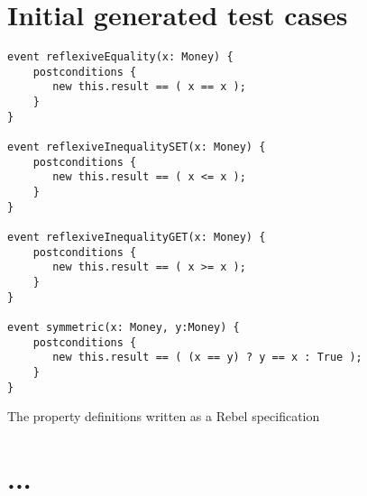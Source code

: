 %



\appendix
\chapter{Initial generated test cases}
\label{app:a_event_definitions}
\begin{sourcecode}[h!]
\begin{lstlisting}[language=Rebel]
event reflexiveEquality(x: Money) {
    postconditions {
       new this.result == ( x == x );
    }
}

event reflexiveInequalitySET(x: Money) {
    postconditions {
       new this.result == ( x <= x );
    }
}

event reflexiveInequalityGET(x: Money) {
    postconditions {
       new this.result == ( x >= x );
    }
}

event symmetric(x: Money, y:Money) {
    postconditions {
       new this.result == ( (x == y) ? y == x : True );
    }
}
\end{lstlisting}
\caption{The property definitions written as a Rebel specification}
\end{sourcecode}

\chapter{...}
\label{app:...}
